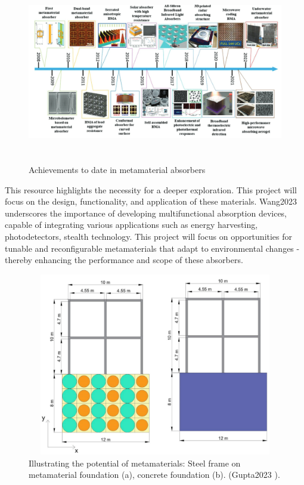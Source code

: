 \begin{figure} [!h]
	\centering
	\includegraphics[width=14cm,height=8cm,keepaspectratio]{figures/introduction/achievements}
	\setlength\belowcaptionskip{3pt}
	\caption{Achievements to date in metamaterial absorbers \cite{wang2023broadband}}
	\label{some-figure}
\end{figure}

This resource highlights the necessity for a deeper exploration. This project will focus on the design, functionality, and application of these materials. Wang2023 underscores the importance of developing multifunctional absorption devices, capable of integrating various applications such as energy harvesting, photodetectors, stealth technology. This project will focus on opportunities for tunable and reconfigurable metamaterials that adapt to environmental changes - thereby enhancing the performance and scope of these absorbers.

\begin{figure} [!h]
	\centering
	\includegraphics[width=14cm,height=8cm,keepaspectratio]{figures/introduction/cloak.png}
	\setlength\belowcaptionskip{3pt}
	\caption{Illustrating the potential of metamaterials: Steel frame on metamaterial foundation (a),  concrete foundation (b). (Gupta2023 \cite{Gupta2023}). }
	\label{some-figure}
\end{figure}









